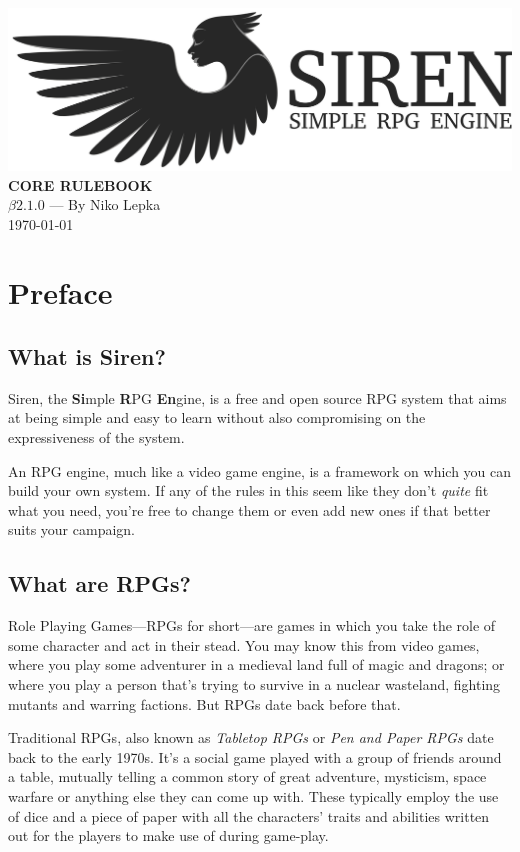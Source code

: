 \documentclass[a4paper]{book}
\begin{document}
\begin{titlepage}
\begin{center}
  \includegraphics[width = \textwidth]{graphics/svg-logo.png}
  \huge{\textbf{CORE RULEBOOK}}\\
  \LARGE{$\beta2.1.0$ --- By Niko Lepka}\\
  \Large{\today}
\end{center}
\end{titlepage}
\thispagestyle{empty} %
\frontmatter %
\chapter*{Preface}
\section*{What is Siren?}
Siren, the \textbf{Si}mple \textbf{R}PG \textbf{En}gine, is a free and open source RPG system that aims at being simple and easy to learn without also compromising on the expressiveness of the system.

An RPG engine, much like a video game engine, is a framework on which you can build your own system. If any of the rules in this seem like they don't \textit{quite} fit what you need, you're free to change them or even add new ones if that better suits your campaign.

\section*{What are RPGs?}
Role Playing Games---RPGs for short---are games in which you take the role of some character and act in their stead.
You may know this from video games, where you play some adventurer in a medieval land full of magic and dragons; or where you play a person that's trying to survive in a nuclear wasteland, fighting mutants and warring factions.
But RPGs date back before that.

Traditional RPGs, also known as \textit{Tabletop RPGs} or \textit{Pen and Paper RPGs} date back to the early 1970s.
It's a social game played with a group of friends around a table, mutually telling a common story of great adventure, mysticism, space warfare or anything else they can come up with.
These typically employ the use of dice and a piece of paper with all the characters' traits and abilities written out for the players to make use of during game-play.
\end{document}
